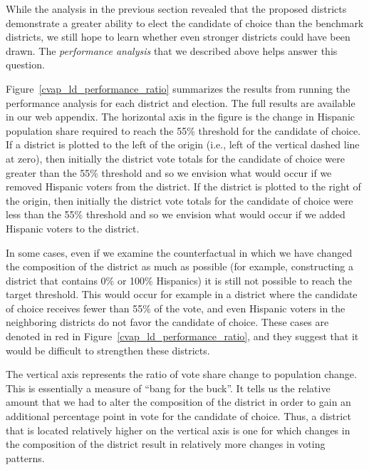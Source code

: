 \documentclass[12pt]{article}
\begin{document}
While the analysis in the previous section revealed that the proposed
districts demonstrate a greater ability to elect the candidate of
choice than the benchmark districts, we still hope to learn whether
even stronger districts could have been drawn.  The \emph{performance
  analysis} that we described above helps answer this question.

Figure~\ref{cvap_ld_performance_ratio} summarizes the results from
running the performance analysis for each district and election.
The full results are available in our web appendix. The horizontal
axis in the figure is the change in Hispanic population share required
to reach the 55\% threshold for the candidate of choice. If a district
is plotted to the left of the origin (i.e., left of the vertical
dashed line at zero), then initially the district vote totals for the
candidate of choice were greater than the 55\% threshold and so we
envision what would occur if we removed Hispanic voters from the
district. If the district is plotted to the right of the origin, then
initially the district vote totals for the candidate of choice were
less than the 55\% threshold and so we envision what would occur if we
added Hispanic voters to the district.

In some cases, even if we examine the counterfactual in which we have
changed the composition of the district as much as possible (for
example, constructing a district that contains 0\% or 100\% Hispanics)
it is still not possible to reach the target threshold. This would
occur for example in a district where the candidate of choice receives
fewer than 55\% of the vote, and even Hispanic voters in the
neighboring districts do not favor the candidate of choice. These cases 
are denoted in red in Figure~\ref{cvap_ld_performance_ratio}, and they suggest
that it would be difficult to strengthen these districts.

The vertical axis represents the ratio of vote share change to
population change. This is essentially a measure of ``bang for the
buck''. It tells us the relative amount that we had to alter the
composition of the district in order to gain an additional percentage
point in vote for the candidate of choice. Thus, a district that is
located relatively higher on the vertical axis is one for which
changes in the composition of the district result in relatively more
changes in voting patterns.
\end{document}
